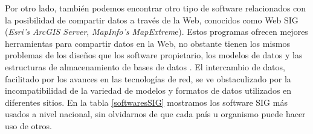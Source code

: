 Por otro lado, también podemos encontrar otro tipo de software relacionados con la posibilidad de compartir datos a través de la Web, conocidos como Web SIG (\textit{Esri’s ArcGIS Server}, \textit{MapInfo’s MapExtrem}e). Estos programas ofrecen mejores herramientas para compartir datos en la Web, no obstante tienen los mismos problemas de los diseños que los software propietario, los modelos de datos y las estructuras de almacenamiento de bases de datos \cite{libro-gis}. El intercambio de datos, facilitado por los avances en las tecnologías de red, se ve obstaculizado por la incompatibilidad de la variedad de modelos y formatos de datos utilizados en diferentes sitios. En la tabla \ref{softwaresSIG} mostramos los software SIG más usados a nivel nacional, sin olvidarnos de que cada país u organismo puede hacer uso de otros.



